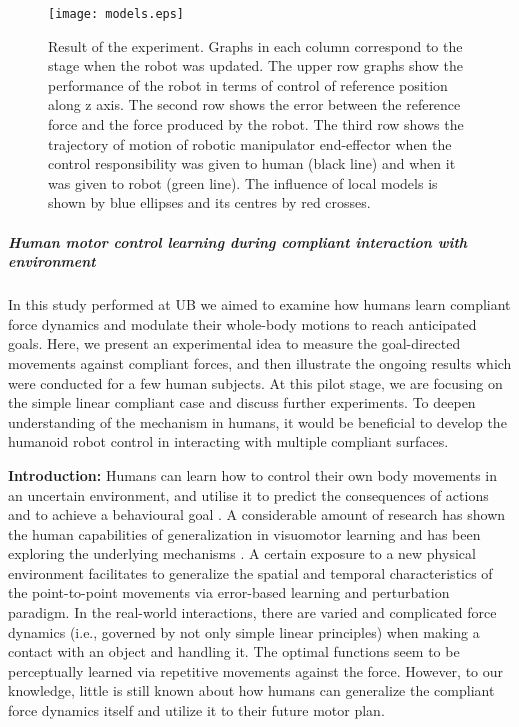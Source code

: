 \begin{figure}[!t]
	\centering
	\texttt{[image: models.eps]}
	\caption{Result of the experiment. Graphs in each column correspond to the stage when the robot was updated. The upper row graphs show the performance of the robot in terms of control of reference position along z axis. The second row shows the error between the reference force and the force produced by the robot. The third row shows the trajectory of motion of robotic manipulator end-effector when the control responsibility was given to human (black line) and when it was given to robot (green line). The influence of local models is shown by blue ellipses and its centres by red crosses.}
	\label{fig:models}
\end{figure}





\subparagraph{Human motor control learning during compliant interaction with environment}

In this study performed at UB we aimed to examine how humans learn compliant force dynamics and modulate their whole-body motions to reach anticipated goals. Here, we present an experimental idea to measure the goal-directed movements against compliant forces, and then illustrate the ongoing results which were conducted for a few human subjects. At this pilot stage, we are focusing on the simple linear compliant case and discuss further experiments. To deepen understanding of the mechanism in humans, it would be beneficial to develop the humanoid robot control in interacting with multiple compliant surfaces.


\textbf{Introduction:} Humans can learn how to control their own body movements in an uncertain environment, and utilise it to predict the consequences of actions and to achieve a behavioural goal \cite{Wolpert11, Davidson&Wolpert03}. A considerable amount of research has shown the human capabilities of generalization in visuomotor learning and has been exploring the underlying mechanisms \cite{Goodbody&Wolpert98, Krakauer06}. A certain exposure to a new physical environment facilitates to generalize the spatial and temporal characteristics of the point-to-point movements via error-based learning and perturbation paradigm. In the real-world interactions, there are varied and complicated force dynamics (i.e., governed by not only simple linear principles) when making a contact with an object and handling it. The optimal functions seem to be perceptually learned via repetitive movements against the force. However, to our knowledge, little is still known about how humans can generalize the compliant force dynamics itself and utilize it to their future motor plan.

